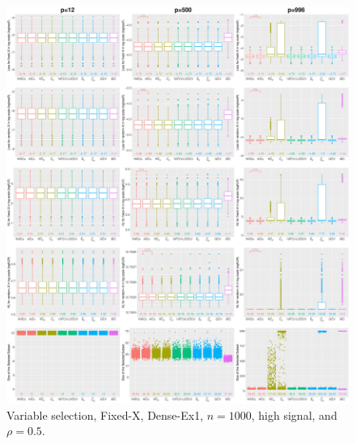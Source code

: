 \begin{figure}[!ht]
\centering
\includegraphics[width=\textwidth]{figures/supplement/fixedx/subset_selection/Dense-Ex1_n1000_hsnr_rho05.eps}
\caption{Variable selection, Fixed-X, Dense-Ex1, $n=1000$, high signal, and $\rho=0.5$.}
\end{figure}
\clearpage
